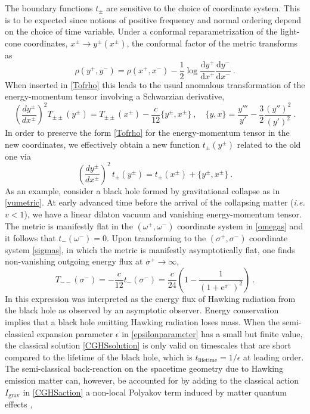 \documentclass[12pt,a4paper]{article}
\newcommand{\dd}{\mathrm{d}}
\newcommand{\e}{\mathrm{e}}
\newcommand{\be}{\begin{equation}}
\newcommand{\ee}{\end{equation}}
\newcommand{\f}[2]{\frac{#1}{#2}}
\begin{document}
The boundary functions $t_\pm$ are sensitive to the choice of coordinate system. This is to be expected since notions of positive frequency and normal ordering depend on the choice of time variable. Under a conformal reparametrization of the light-cone coordinates, $x^\pm\rightarrow y^\pm(x^\pm)$, the conformal factor of the metric transforms as 
\be
\rho(y^+,y^-) = \rho(x^+,x^-) -\f12 \log \f{\dd y^+}{\dd x^+} \f{\dd y^-}{\dd x^-}~.
\ee
When inserted in \eqref{Tofrho} this leads to the usual anomalous transformation of the energy-momentum tensor involving a Schwarzian derivative, 
\be\label{Ttrafo}
\left(\f{dy^\pm}{dx^\pm}\right)^2 T_{\pm\pm}(y^\pm) = T_{\pm\pm}(x^\pm) 
- \f{c}{12}\{y^\pm,x^\pm\}~,\quad \{y,x\} = \f{y'''}{y'}-\f32\f{(y'')^2}{(y')^2}~.
\ee
In order to preserve the form \eqref{Tofrho} for the energy-momentum tensor in the new coordinates, we effectively obtain a new function $t_\pm(y^\pm)$ related to the old one via
\be\label{littlettrafo}
\left(\f{dy^\pm}{dx^\pm}\right)^2 \, t_\pm(y^\pm) = t_\pm(x^\pm) + \{y^\pm,x^\pm\}~.
\ee
As an example, consider a black hole formed by gravitational collapse as in \eqref{vumetric}. At early advanced time before the arrival of the collapsing matter ({\it i.e.} $v<1$), we have a linear dilaton vacuum and vanishing energy-momentum tensor. The metric is manifestly flat in the $(\omega^+,\omega^-)$ coordinate system in \eqref{omegas} and it follows that $t_-(\omega^-)=0$. 
Upon transforming to the $(\sigma^+,\sigma^-)$ coordinate system \eqref{sigmas}, in which the metric is manifestly asymptotically flat, one finds non-vanishing outgoing energy flux at $\sigma^+\rightarrow \infty$,
\be\label{Hflux}
T_{--}(\sigma^-) = -\frac{c}{12} t_{-}(\sigma^-) = \f{c}{24}\left(1-\f{1}{(1+\e^{\sigma^-})^2}\right)~.
\ee
In \cite{Callan:1992rs} this expression was interpreted as the energy flux of Hawking radiation from the black hole as observed by an asymptotic observer. 
Energy conservation implies that a black hole emitting Hawking radiation loses mass. When the semi-classical expansion parameter $\epsilon$ in \eqref{epsilonparameter} has a small but finite value, the classical solution \eqref{CGHSsolution} is only valid on timescales that are short compared to the lifetime of the black hole, which is $t_\text{lifetime}= 1/\epsilon$ at leading order. The semi-classical back-reaction on the spacetime geometry due to Hawking emission matter can, however, be accounted for by adding to the classical action $I_\text{grav}$ in \eqref{CGHSaction} a non-local Polyakov term induced by matter quantum effects \cite{Callan:1992rs}, 
\end{document}
